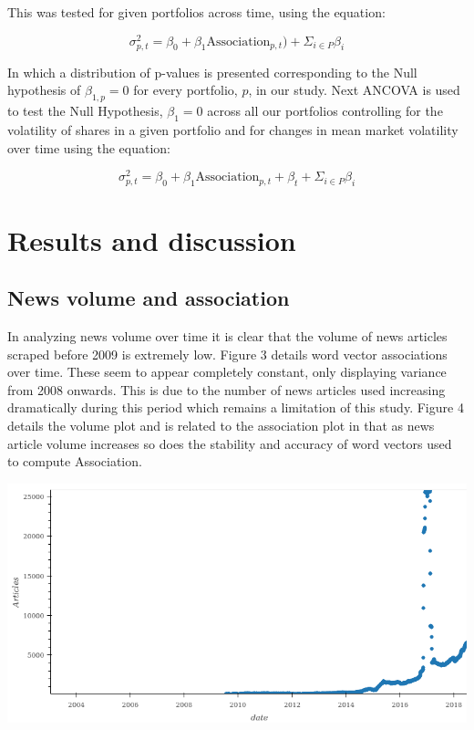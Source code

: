 \documentclass[11pt]{article}
\makeatletter
\def\maxwidth{\ifdim\Gin@nat@width>\linewidth\linewidth
    \else\Gin@nat@width\fi}
\let\Oldincludegraphics\includegraphics
\renewcommand{\includegraphics}[1]{\Oldincludegraphics[width=.8\maxwidth]{#1}}
\makeatother
\begin{document}
This was tested for given portfolios across time, using the equation:

\[ \sigma_{p,t}^{2} = \beta_{0} + \beta_{1} \text{Association}_{p, t}) + \Sigma_{i \in P} \beta_{i}\]

In which a distribution of p-values is presented corresponding to the
Null hypothesis of \(\beta_{1, p} = 0\) for every portfolio, \(p\), in
our study. Next ANCOVA is used to test the Null Hypothesis,
\(\beta_{1} = 0\) across all our portfolios controlling for the
volatility of shares in a given portfolio and for changes in mean market
volatility over time using the equation:

\[ \sigma_{p,t}^{2} = \beta_{0} + \beta_{1} \text{Association}_{p,t} + \beta_{t} + \Sigma_{i \in P} \beta_{i} \]

\newpage

\hypertarget{results-and-discussion}{%
\section{Results and discussion}\label{results-and-discussion}}

\hypertarget{news-volume-and-association}{%
\subsection{News volume and
association}\label{news-volume-and-association}}

In analyzing news volume over time it is clear that the volume of news
articles scraped before 2009 is extremely low. Figure 3 details word
vector associations over time. These seem to appear completely constant,
only displaying variance from 2008 onwards. This is due to the number of
news articles used increasing dramatically during this period which
remains a limitation of this study. Figure 4 details the volume plot and
is related to the association plot in that as news article volume
increases so does the stability and accuracy of word vectors used to
compute Association.

\includegraphics{../experiments/media/News Volume.png}\\
\end{document}
